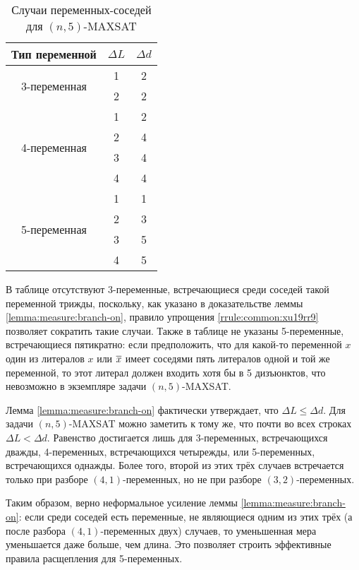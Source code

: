 \begin{table}[ht]
 \centering
 \caption{Случаи переменных-соседей для $(n,5)$-MAXSAT}
 \begin{tabular}{|c|c|c|}
  \hline
  Тип переменной & $\Delta L$ & $\Delta d$ \\
  \hline\hline
  \multirow{2}{*}{3-переменная}
                 & 1          & 2 \\
                 & 2          & 2 \\
  \hline
  \multirow{4}{*}{4-переменная}
                 & 1          & 2 \\
                 & 2          & 4 \\
                 & 3          & 4 \\
                 & 4          & 4 \\
  \hline
  \multirow{4}{*}{5-переменная}
                 & 1          & 1 \\
                 & 2          & 3 \\
                 & 3          & 5 \\
                 & 4          & 5 \\
  \hline
 \end{tabular}
 \label{table:n5:varcases}
\end{table}

В таблице отсутствуют 3-переменные, встречающиеся среди соседей такой переменной трижды, поскольку, как указано в доказательстве леммы \ref{lemma:measure:branch-on}, правило упрощения \ref{rrule:common:xu19rr9} позволяет сократить такие случаи. Также в таблице не указаны 5-переменные, встречающиеся пятикратно: если предположить, что для какой-то переменной $x$ один из литералов $x$ или $\overline{x}$ имеет соседями пять литералов одной и той же переменной, то этот литерал должен входить хотя бы в 5 дизъюнктов, что невозможно в экземпляре задачи $(n,5)$-MAXSAT.

Лемма \ref{lemma:measure:branch-on} фактически утверждает, что $\Delta L \leq \Delta d$. Для задачи $(n,5)$-MAXSAT можно заметить к тому же, что почти во всех строках $\Delta L < \Delta d$. Равенство достигается лишь для 3-переменных, встречающихся дважды, 4-переменных, встречающихся четырежды, или 5-переменных, встречающихся однажды. Более того, второй из этих трёх случаев встречается только при разборе $(4,1)$-переменных, но не при разборе $(3,2)$-переменных.

Таким образом, верно неформальное усиление леммы \ref{lemma:measure:branch-on}: если среди соседей есть переменные, не являющиеся одним из этих трёх (а после разбора $(4,1)$-переменных двух) случаев, то уменьшенная мера уменьшается даже больше, чем длина. Это позволяет строить эффективные правила расщепления для 5-переменных.


